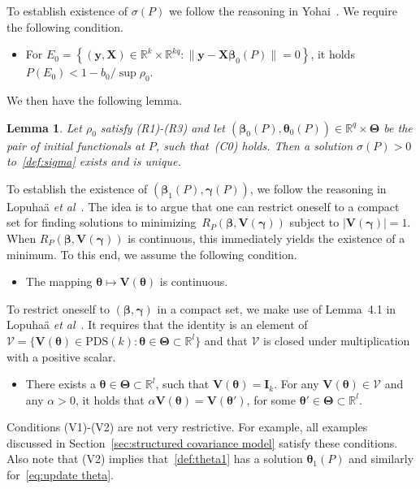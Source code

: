 \documentclass{article}
\numberwithin{equation}{section}
\theoremstyle{plain}
\newtheorem{lemma}{Lemma}
\newcommand{\R}{\mathbb{R}}
\newcommand{\bbeta}{\bm\beta}
\newcommand{\btheta}{\bm\theta}
\newcommand{\bgamma}{\bm\gamma}
\newcommand{\bTheta}{\bm\Theta}
\newcommand{\by}{\mathbf{y}}
\newcommand{\bX}{\mathbf{X}}
\newcommand{\bV}{\mathbf{V}}
\newcommand{\bI}{\mathbf{I}}
\begin{document}
To establish existence of $\sigma(P)$ we follow the reasoning in Yohai~\cite{yohai1987}.
We require the following condition.
\begin{itemize}
\item[(C0)]
For 
$
E_0
=
\left\{
(\by,\bX)\in\R^k\times\R^{kq}:
\|\by-\bX\bbeta_0(P)\|=0
\right\}$,
it holds $P(E_0)<1-b_0/\sup\rho_0$.
\end{itemize}
We then have the following lemma.
\begin{lemma}
\label{lem:existence sigma}
Let $\rho_0$ satisfy (R1)-(R3) and let $(\bbeta_0(P),\btheta_0(P))\in\R^{q}\times\bTheta$ be the pair of initial functionals at $P$,
such that~(C0) holds.
Then a solution $\sigma(P)>0$ to~\eqref{def:sigma} exists and is unique.
\end{lemma}
To establish the existence of $(\bbeta_1(P),\bgamma(P))$, we follow the reasoning in Lopuha\"a \textit{et al}~\cite{lopuhaa-gares-ruizgazen2023}.
The idea is to argue that one can restrict oneself to a compact set for finding solutions to
minimizing~$R_P(\bbeta,\bV(\bgamma))$ subject to $|\bV(\bgamma)|=1$.
When $R_P(\bbeta,\bV(\bgamma))$ is continuous, this immediately yields the existence of a minimum.
To this end, we assume the following condition.
\begin{itemize}
\item[(V1)]
The mapping $\btheta\mapsto\bV(\btheta)$ is continuous.
\end{itemize}
To restrict oneself to $(\bbeta,\bgamma)$ in a compact set, we make use of Lemma~4.1
in Lopuha\"a \textit{et al}~\cite{lopuhaa-gares-ruizgazen2023}.
It requires that the identity is an element of
$\mathcal{V}=\{\bV(\btheta)\in\text{PDS}(k):\btheta\in\bTheta\subset\R^l\}$
and that $\mathcal{V}$ is closed under multiplication with a positive scalar.
\begin{itemize}
\item[(V2)]
There exists a $\btheta\in\bTheta\subset\R^l$, such that $\bV(\btheta)=\bI_k$.
For any $\bV(\btheta)\in \mathcal{V}$ and any $\alpha>0$, it holds that
$\alpha\bV(\btheta)=\bV(\btheta')$, for some $\btheta'\in\bTheta\subset\R^l$.
\end{itemize}
Conditions (V1)-(V2) are not very restrictive.
For example, all examples discussed in Section~\ref{sec:structured covariance model}
satisfy these conditions.
Also note that (V2) implies that~\eqref{def:theta1} has a solution $\btheta_1(P)$
and similarly for~\eqref{eq:update theta}.
\end{document}
